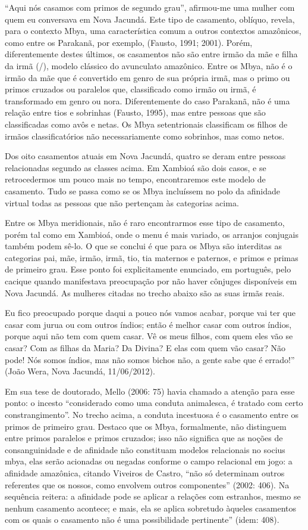 {{``Aqui nós casamos com primos de segundo grau'', afirmou-me uma mulher com
quem eu conversava em Nova Jacundá. Este tipo de casamento, oblíquo,
revela, para o contexto Mbya, uma característica comum a outros
contextos amazônicos, como entre os Parakanã, por exemplo, (Fausto,
1991; 2001). Porém, diferentemente destes últimos, os casamentos não
são entre irmão da mãe e filha da irmã (/), modelo clássico do
avunculato amazônico. Entre os Mbya, não é o irmão da mãe que é
convertido em genro de sua própria irmã, mas o primo ou primos cruzados
ou paralelos que, classificado como irmão ou irmã, é transformado em
genro ou nora. Diferentemente do caso Parakanã, não é uma relação entre
tios e sobrinhas (Fausto, 1995), mas entre pessoas que são
classificadas como avôs e netas. Os Mbya setentrionais classificam os
filhos de irmãos classificatórios não necessariamente como sobrinhos,
mas como netos.

Dos oito casamentos atuais em Nova Jacundá, quatro se deram entre
pessoas relacionadas segundo as classes acima. Em Xambioá são dois
casos, e se retrocedermos um pouco mais no tempo, encontraremos este
modelo de casamento. Tudo se passa como se os Mbya incluíssem no polo
da afinidade virtual todas as pessoas que não pertençam às categorias
acima.

Entre os Mbya meridionais, não é raro encontrarmos esse tipo de
casamento, porém tal como em Xambioá, onde o menu é mais variado, os
arranjos conjugais também podem sê-lo. O que se conclui é que para os
Mbya são interditas as categorias pai, mãe, irmão, irmã, tio, tia
maternos e paternos, e primos e primas de primeiro grau. Esse ponto foi
explicitamente enunciado, em português, pelo cacique quando manifestava
preocupação por não haver cônjuges disponíveis em Nova Jacundá. As
mulheres citadas no trecho abaixo são as suas irmãs reais.

Eu fico preocupado porque daqui a pouco nós vamos acabar, porque vai ter
que casar com jurua ou com outros índios; então é melhor casar com
outros índios, porque aqui não tem com quem casar. Vê os meus filhos,
com quem eles vão se casar? Com as filhas da Maria? Da Divina? E elas
com quem vão casar? Não pode! Nós somos índios, mas não somos bichos
não, a gente sabe que é errado!'' (João Wera, Nova Jacundá, 11/06/2012).

Em sua tese de doutorado, Mello (2006: 75) havia chamado a atenção para
esse ponto: o incesto ``considerado como uma conduta animalesca, é
tratado com certo constrangimento''. No trecho acima, a conduta
incestuosa é o casamento entre os primos de primeiro grau. Destaco que
os Mbya, formalmente, não distinguem entre primos paralelos e primos
cruzados; isso não significa que as noções de consanguinidade e de
afinidade não constituam modelos relacionais no socius mbya, elas serão
acionadas ou negadas conforme o campo relacional em jogo: a afinidade
amazônica, citando Viveiros de Castro, ``não só determinam outros
referentes que os nossos, como envolvem outros componentes'' (2002: 406).
Na sequência reitera: a afinidade pode se aplicar a relações com
estranhos, mesmo se nenhum casamento acontece; e mais, ela se aplica
sobretudo àqueles casamentos com os quais o casamento não é uma
possibilidade pertinente'' (idem: 408).

}}
